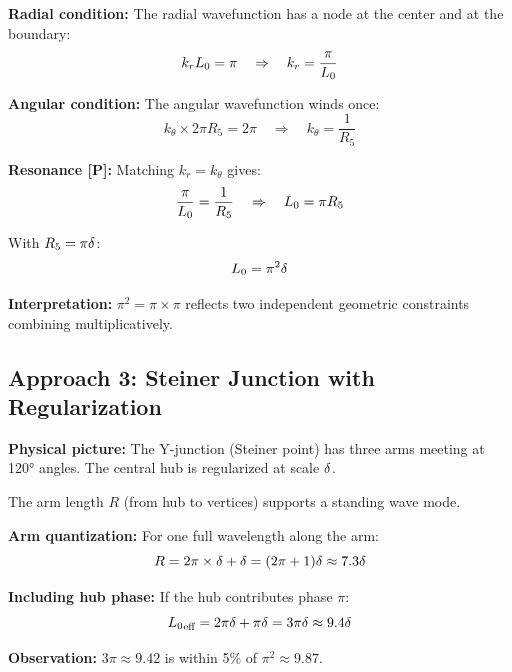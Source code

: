 \begin{derivationbox}[title=Two-Fold Winding Argument]
    \textbf{Radial condition:} The radial wavefunction has a node at the center
    and at the boundary:
    \begin{equation}
        k_r L_0 = \pi \quad \Rightarrow \quad k_r = \frac{\pi}{L_0}
    \end{equation}

    \textbf{Angular condition:} The angular wavefunction winds once:
    \begin{equation}
        k_\theta \times 2\pi R_5 = 2\pi \quad \Rightarrow \quad k_\theta = \frac{1}{R_5}
    \end{equation}

    \textbf{Resonance [P]:} Matching $k_r = k_\theta$ gives:
    \begin{equation}
        \frac{\pi}{L_0} = \frac{1}{R_5} \quad \Rightarrow \quad L_0 = \pi R_5
    \end{equation}

    With $R_5 = \pi\delta$:
    \begin{equation}
        L_0 = \pi^2 \delta
    \end{equation}
    \tagP
\end{derivationbox}

\textbf{Interpretation:} $\pi^2 = \pi \times \pi$ reflects two independent
geometric constraints combining multiplicatively.

\subsection{Approach 3: Steiner Junction with Regularization}

\textbf{Physical picture:} The Y-junction (Steiner point) has three arms meeting
at 120° angles. The central hub is regularized at scale $\delta$.

\begin{derivationbox}[title=Steiner Junction Argument]
    The arm length $R$ (from hub to vertices) supports a standing wave mode.

    \textbf{Arm quantization:} For one full wavelength along the arm:
    \begin{equation}
        R = 2\pi \times \delta + \delta = (2\pi + 1)\delta \approx 7.3\delta
    \end{equation}

    \textbf{Including hub phase:} If the hub contributes phase $\pi$:
    \begin{equation}
        {L_0}_{\text{eff}} = 2\pi\delta + \pi\delta = 3\pi\delta \approx 9.4\delta
    \end{equation}

    \textbf{Observation:} $3\pi \approx 9.42$ is within 5\% of $\pi^2 \approx 9.87$.
    \tagP
\end{derivationbox}


